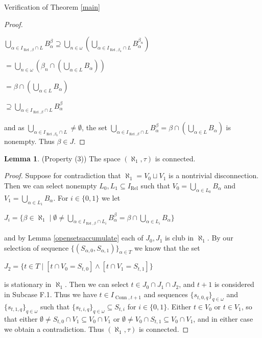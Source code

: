 \documentclass{amsart}
\theoremstyle{definition}\newtheorem{theorem}{Theorem}
\theoremstyle{definition}\newtheorem{bigtheorem}{Theorem}
\numberwithin{theorem}{section}
\theoremstyle{definition}\newtheorem{corollary}[theorem]{Corollary}
\theoremstyle{definition}\newtheorem{proposition}[theorem]{Proposition}
\theoremstyle{definition}\newtheorem{definition}[theorem]{Definition}
\theoremstyle{definition}\newtheorem{question}[theorem]{Question}
\theoremstyle{definition}\newtheorem{example}[theorem]{Example}
\theoremstyle{definition}\newtheorem{remark}[theorem]{Remark}
\theoremstyle{definition}\newtheorem{note}[theorem]{Note}
\theoremstyle{definition}\newtheorem{lemma}[theorem]{Lemma}
\theoremstyle{definition}\newtheorem{fact}[theorem]{Fact}
\theoremstyle{definition}\newtheorem{define}[theorem]{Definition}
\theoremstyle{definition}\newtheorem{definitions}[theorem]{Definitions}
\theoremstyle{definition}\newtheorem{claim}[theorem]{Claim}
\theoremstyle{definition}\newtheorem{obs}[theorem]{Observation}
\theoremstyle{definition}\newtheorem{construction}[theorem]{Construction}
\newcommand{\Rel}{\operatorname{Rel}}
\newcommand{\Conn}{\operatorname{Conn}}
\begin{document}
\begin{section}{Verification of Theorem \ref{main}}
\begin{proof}
\begin{center}
$\bigcup_{\alpha \in I_{\Rel, \beta}\cap L} B_{\alpha}^{\beta} \supseteq \bigcup_{n\in \omega} (\bigcup_{\alpha \in I_{\Rel, \beta_n} \cap L} B_{\alpha}^{\beta_n})$

$= \bigcup_{n \in \omega} (\beta_n \cap (\bigcup_{\alpha \in L} B_{\alpha}))$

$= \beta \cap (\bigcup_{\alpha \in L} B_{\alpha})$

$\supseteq \bigcup_{\alpha \in I_{\Rel, \beta}\cap L} B_{\alpha}^{\beta}$

\end{center}

\noindent and as $\bigcup_{\alpha \in I_{\Rel, \beta_0} \cap L} \neq \emptyset$, the set $\bigcup_{\alpha \in I_{\Rel, \beta}\cap L} B_{\alpha}^{\beta} = \beta \cap (\bigcup_{\alpha \in L} B_{\alpha})$ is nonempty.  Thus $\beta \in J$.



\end{proof}

\begin{lemma} \label{connectedindeed}(Property (3))  The space $(\aleph_1, \tau)$ is connected.
\end{lemma}

\begin{proof}  Suppose for contradiction that $\aleph_1 = V_0 \sqcup V_1$ is a nontrivial disconnection.  Then we can select nonempty $L_0, L_1 \subseteq I_{\Rel}$ such that $V_0 = \bigcup_{\alpha \in L_0} B_{\alpha}$ and $V_1 = \bigcup_{\alpha \in L_1} B_{\alpha}$.  For $i \in \{0, 1\}$ we let

\begin{center}
$J_i = \{\beta \in \aleph_1 \mid \emptyset \neq \bigcup_{\alpha \in I_{\Rel, \beta} \cap L_i} B_{\alpha}^{\beta} = \beta \cap \bigcup_{\alpha \in L_i} B_{\alpha}\}$
\end{center}


\noindent and by Lemma \ref{opensetsaccumulate} each of $J_0, J_1$ is club in $\aleph_1$.  By our selection of sequence $\{(S_{\alpha, 0}, S_{\alpha, 1})\}_{\alpha \in T}$ we know that the set

\begin{center}
$J_2 = \{t \in T \mid [t \cap V_0 = S_{t, 0}] \wedge [t \cap V_1 = S_{t, 1}]\}$
\end{center}

\noindent is stationary in $\aleph_1$.  Then we can select $t \in J_0 \cap J_1 \cap J_2$, and $t + 1$ is considered in Subcase F.1.  Thus we have $t \in I_{\Conn, t+1}$ and sequences $\{s_{t, 0, q}\}_{q \in \omega}$ and $\{s_{t, 1, q}\}_{q \in \omega}$ such that $\{s_{t, i, q}\}_{q\in \omega} \subseteq S_{t, i}$ for $i\in \{0, 1\}$.  Either $t \in V_0$ or $t \in V_1$, so that either $\emptyset \neq S_{t, 0} \cap V_1 \subseteq V_0 \cap V_1$ or $\emptyset \neq V_0 \cap S_{t, 1} \subseteq V_0 \cap V_1$, and in either case we obtain a contradiction.  Thus $(\aleph_1, \tau)$ is connected.


\end{proof}
\end{section}
\end{document}
